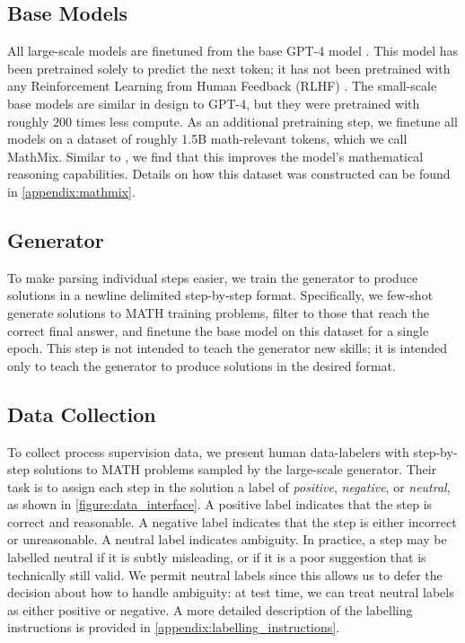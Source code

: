 \subsection{Base Models} \label{section:base_models}

All large-scale models are finetuned from the base GPT-4 model \citep{gpt4}. This model has been pretrained solely to predict the next token; it has not been pretrained with any Reinforcement Learning from Human Feedback (RLHF) \citep{christiano2017deep}. The small-scale base models are similar in design to GPT-4, but they were pretrained with roughly $200$ times less compute. As an additional pretraining step, we finetune all models on a dataset of roughly 1.5B math-relevant tokens, which we call MathMix. Similar to \cite{lewkowycz2022solving}, we find that this improves the model's mathematical reasoning capabilities. Details on how this dataset was constructed can be found in \ref{appendix:mathmix}.

\subsection{Generator} \label{section:generator}

To make parsing individual steps easier, we train the generator to produce solutions in a newline delimited step-by-step format. Specifically, we few-shot generate solutions to MATH training problems, filter to those that reach the correct final answer, and finetune the base model on this dataset for a single epoch. This step is not intended to teach the generator new skills; it is intended only to teach the generator to produce solutions in the desired format. 

\subsection{Data Collection} \label{section:data_collection}

To collect process supervision data, we present human data-labelers with step-by-step solutions to MATH problems sampled by the large-scale generator. Their task is to assign each step in the solution a label of \textit{positive}, \textit{negative}, or \textit{neutral}, as shown in \ref{figure:data_interface}. A positive label indicates that the step is correct and reasonable. A negative label indicates that the step is either incorrect or unreasonable. A neutral label indicates ambiguity. In practice, a step may be labelled neutral if it is subtly misleading, or if it is a poor suggestion that is technically still valid. We permit neutral labels since this allows us to defer the decision about how to handle ambiguity: at test time, we can treat neutral labels as either positive or negative. A more detailed description of the labelling instructions is provided in \ref{appendix:labelling_instructions}.

